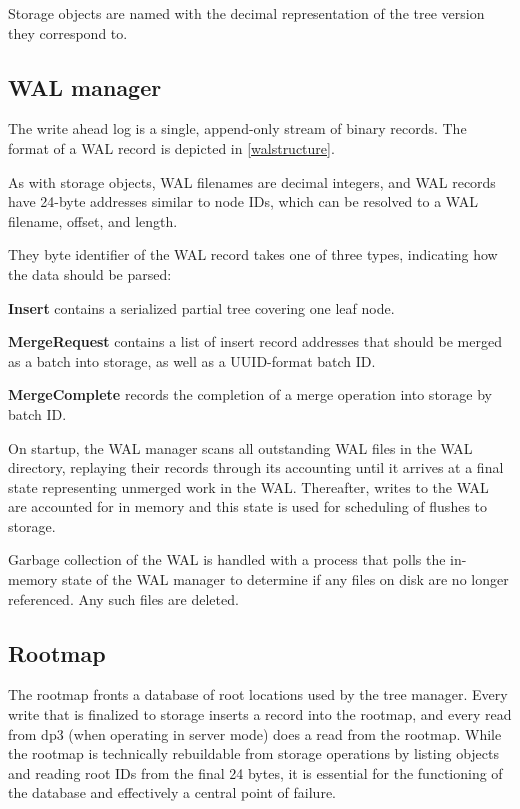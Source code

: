 \documentclass[9pt,twocolumn]{article}
\begin{document}
    Storage objects are named with the decimal representation of the tree version
    they correspond to.

    \subsection{WAL manager}
    The write ahead log is a single, append-only stream of binary records. The
    format of a WAL record is depicted in \autoref{walstructure}.

    As with storage objects, WAL filenames are decimal integers, and WAL records
    have 24-byte addresses similar to node IDs, which can be resolved to a WAL
    filename, offset, and length.

    They byte identifier of the WAL record takes one of three types, indicating
    how the data should be parsed:

    \textbf{Insert} contains a serialized partial tree covering one leaf node.

    \textbf{MergeRequest} contains a list of insert record addresses that
    should be merged as a batch into storage, as well as a UUID-format batch
    ID.

    \textbf{MergeComplete} records the completion of a merge operation into
    storage by batch ID.

    On startup, the WAL manager scans all outstanding WAL files in the WAL
    directory, replaying their records through its accounting until it arrives at a
    final state representing unmerged work in the WAL. Thereafter, writes to the
    WAL are accounted for in memory and this state is used for scheduling of
    flushes to storage.

    Garbage collection of the WAL is handled with a process that polls the
    in-memory state of the WAL manager to determine if any files on disk are no
    longer referenced. Any such files are deleted.

    \subsection{Rootmap} \label{rootmap}
    The rootmap fronts a database of root locations used by the tree manager.
    Every write that is finalized to storage inserts a record into the rootmap,
    and every read from dp3 (when operating in server mode) does a read from
    the rootmap. While the rootmap is technically rebuildable from storage
    operations by listing objects and reading root IDs from the final 24 bytes,
    it is essential for the functioning of the database and effectively a
    central point of failure.
\end{document}
